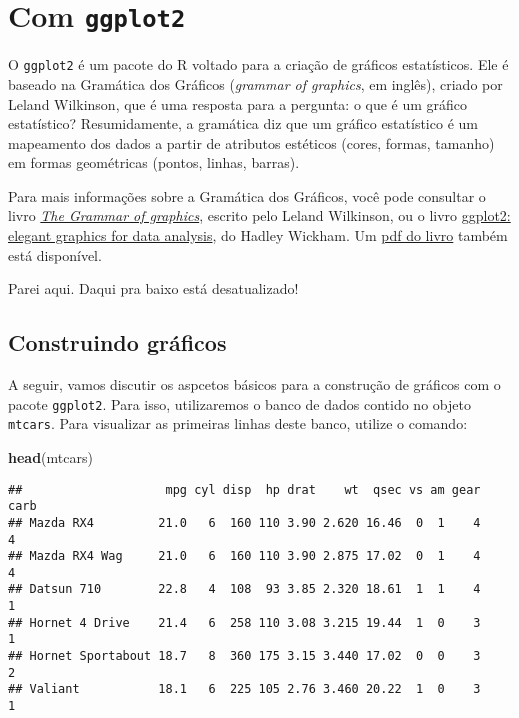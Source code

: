 \documentclass[]{book}
\newenvironment{Shaded}{\begin{snugshade}}{\end{snugshade}}
\newcommand{\KeywordTok}[1]{\textcolor[rgb]{0.13,0.29,0.53}{\textbf{{#1}}}}
\newcommand{\NormalTok}[1]{{#1}}
\begin{document}
\section{\texorpdfstring{Com
\texttt{ggplot2}}{Com ggplot2}}\label{com-ggplot2}

O \texttt{ggplot2} é um pacote do R voltado para a criação de gráficos
estatísticos. Ele é baseado na Gramática dos Gráficos (\emph{grammar of
graphics}, em inglês), criado por Leland Wilkinson, que é uma resposta
para a pergunta: o que é um gráfico estatístico? Resumidamente, a
gramática diz que um gráfico estatístico é um mapeamento dos dados a
partir de atributos estéticos (cores, formas, tamanho) em formas
geométricas (pontos, linhas, barras).

Para mais informações sobre a Gramática dos Gráficos, você pode
consultar o livro
\href{http://www.springer.com/statistics/computational+statistics/book/978-0-387-24544-7}{\emph{The
Grammar of graphics}}, escrito pelo Leland Wilkinson, ou o livro
\href{http://ggplot2.org/book/}{ggplot2: elegant graphics for data
analysis}, do Hadley Wickham. Um
\href{http://moderngraphics11.pbworks.com/f/ggplot2-Book09hWickham.pdf}{pdf
do livro} também está disponível.

Parei aqui. Daqui pra baixo está desatualizado!

\subsection{Construindo gráficos}\label{construindo-graficos}

A seguir, vamos discutir os aspcetos básicos para a construção de
gráficos com o pacote \texttt{ggplot2}. Para isso, utilizaremos o banco
de dados contido no objeto \texttt{mtcars}. Para visualizar as primeiras
linhas deste banco, utilize o comando:

\begin{Shaded}
\begin{Highlighting}[]
\KeywordTok{head}\NormalTok{(mtcars)}
\end{Highlighting}
\end{Shaded}

\begin{verbatim}
##                    mpg cyl disp  hp drat    wt  qsec vs am gear carb
## Mazda RX4         21.0   6  160 110 3.90 2.620 16.46  0  1    4    4
## Mazda RX4 Wag     21.0   6  160 110 3.90 2.875 17.02  0  1    4    4
## Datsun 710        22.8   4  108  93 3.85 2.320 18.61  1  1    4    1
## Hornet 4 Drive    21.4   6  258 110 3.08 3.215 19.44  1  0    3    1
## Hornet Sportabout 18.7   8  360 175 3.15 3.440 17.02  0  0    3    2
## Valiant           18.1   6  225 105 2.76 3.460 20.22  1  0    3    1
\end{verbatim}
\end{document}
